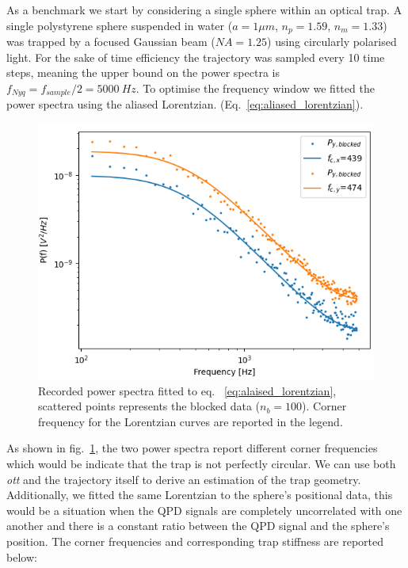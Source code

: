 As a benchmark we start by considering a single sphere within an optical 
trap. A single polystyrene sphere suspended in water ($a=1\mu m$, 
$n_p=1.59$, $n_m=1.33$) was trapped by a focused Gaussian beam ($NA=1.25$) using circularly polarised light. For the sake of time efficiency the trajectory was sampled every 10 time steps, meaning the upper bound on 
the power spectra is $f_{Nyq}=f_{sample}/2=5000\ Hz$. To optimise the 
frequency window we fitted the power spectra using the aliased Lorentzian.
(Eq.~\eqref{eq:aliased_lorentzian}). 
\begin{figure}[h!]
	\centering
	\includegraphics[width=\linewidth]{PSD_sphere.png}
	\caption{Recorded power spectra fitted to eq.~
		\ref{eq:alaised_lorentzian}, scattered points represents 
		the blocked data ($n_b=100$). Corner frequency for the 
		Lorentzian curves are reported in the legend.}
	\label{fig:psd_sphere}
\end{figure} 

As shown in fig.~\ref{fig:psd_sphere}, the two power spectra 
report different corner frequencies which would be indicate 
that the trap is not perfectly circular. We can use both 
\textit{ott} and the trajectory itself to derive an estimation 
of the trap geometry. Additionally, we fitted the 
same Lorentzian to the sphere's positional data, this would be a
situation when the QPD signals are completely uncorrelated with 
one another and there is a constant ratio between the QPD signal 
and the sphere's position. The corner frequencies and corresponding 
trap stiffness are reported below:

